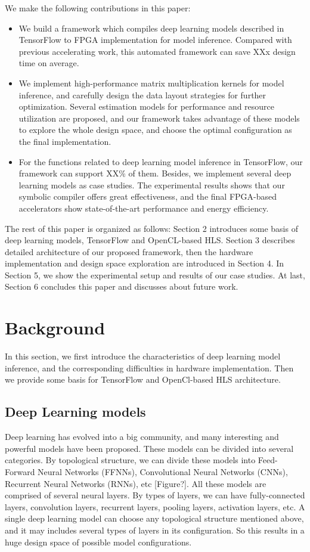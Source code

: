 \documentclass{acm_proc_article-sp-copy}
\begin{document}
We make the following contributions in this paper:
\begin{itemize}
\item We build a framework which compiles deep learning models described in TensorFlow to FPGA implementation for model inference. Compared with previous accelerating work, this automated framework can save XXx design time on average. 
\item We implement high-performance matrix multiplication kernels for model inference, and carefully design the data layout strategies for further optimization. Several estimation models for performance and resource utilization are proposed, and our framework takes advantage of these models to explore the whole design space, and choose the optimal configuration as the final implementation.
\item For the functions related to deep learning model inference in TensorFlow, our framework can support XX\% of them. Besides, we implement several deep learning models as case studies. The experimental results shows that our symbolic compiler offers great effectiveness, and the final FPGA-based accelerators show state-of-the-art performance and energy efficiency.
\end{itemize}

The rest of this paper is organized as follows: Section 2 introduces some basis of deep learning models, TensorFlow and OpenCL-based HLS. Section 3 describes detailed architecture of our proposed framework, then the hardware implementation and design space exploration are introduced in Section 4. In Section 5, we show the experimental setup and results of our case studies. At last, Section 6 concludes this paper and discusses about future work.

\section{Background}
In this section, we first introduce the characteristics of deep learning model inference, and the corresponding difficulties in hardware implementation. Then we provide some basis for TensorFlow and OpenCl-based HLS architecture.

\subsection{Deep Learning models}
Deep learning has evolved into a big community, and many interesting and powerful models have been proposed. These models can be divided into several categories. By topological structure, we can divide these models into Feed-Forward Neural Networks (FFNNs), Convolutional Neural Networks (CNNs), Recurrent Neural Networks (RNNs), etc [Figure?]. All these models are comprised of several neural layers. By types of layers, we can have fully-connected layers, convolution layers, recurrent layers, pooling layers, activation layers, etc. A single deep learning model can choose any topological structure mentioned above, and it may includes several types of layers in its configuration. So this results in a huge design space of possible model configurations.
\end{document}
